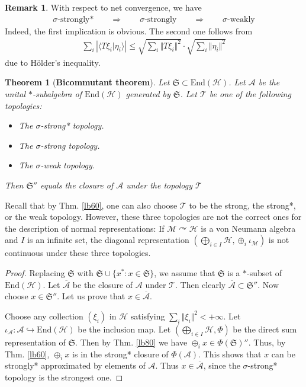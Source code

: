 \documentclass[12pt,b5paper,notitlepage]{article}
\theoremstyle{definition}
\newtheorem{rem}[df]{Remark}
\theoremstyle{plain}
\newtheorem{thm}[df]{Theorem}
\newcommand{\fk}{\mathfrak}
\newcommand{\mc}{\mathcal}
\newcommand{\ovl}{\overline}
\newcommand{\End}{\mathrm{End}} %
\newcommand{\bk}[1]{\langle {#1}\rangle}
\numberwithin{equation}{section}
\begin{document}
\begin{rem}
With respect to net convergence, we have
\begin{align*}
\text{$\sigma$-strongly*}\qquad\Longrightarrow\qquad\text{$\sigma$-strongly}\qquad\Longrightarrow\qquad\text{$\sigma$-weakly}
\end{align*}
Indeed, the first implication is obvious. The second one follows from
\begin{align*}
\sum_i |\bk{T\xi_i|\eta_i}|\leq\sqrt{\sum_i\Vert T\xi_i\Vert^2}\cdot\sqrt{\sum_i\Vert\eta_i\Vert^2}
\end{align*}
due to H\"older's inequality.
\end{rem}



\begin{thm}[\textbf{Bicommutant theorem}]\label{lb86}
Let $\fk S\subset\End(\mc H)$. Let $\mc A$ be the unital $*$-subalgebra of $\End(\mc H)$ generated by $\fk S$. Let $\mc T$ be one of the following topologies:
\begin{itemize}
\item[(a)] The $\sigma$-strong* topology.
\item[(b)] The $\sigma$-strong topology.
\item[(c)] The $\sigma$-weak topology.
\end{itemize}
Then $\fk S''$ equals the closure of $\mc A$ under the topology $\mc T$
\end{thm}

Recall that by Thm. \ref{lb60}, one can also choose $\mc T$ to be the strong, the strong*, or the weak topology. However, these three topologies are not the correct ones for the description of normal representations: If $\mc M\curvearrowright\mc H$ is a von Neumann algebra and $I$ is an infinite set, the diagonal representation $(\bigoplus_{i\in I}\mc H,\oplus_i\iota_{\mc M})$ is not continuous under these three topologies.


\begin{proof}
Replacing $\fk S$ with $\fk S\cup\{x^*:x\in\fk S\}$, we assume that $\fk S$ is a $*$-subset of $\End(\mc H)$. Let $\ovl{\mc A}$ be the closure of $\mc A$ under $\mc T$. Then clearly $\ovl{\mc A}\subset\fk S''$. Now choose $x\in\fk S''$. Let us prove that $x\in\ovl{\mc A}$. 




Choose any collection $(\xi_i)$ in $\mc H$ satisfying $\sum_i\Vert\xi_i\Vert^2<+\infty$. Let $\iota_{\mc A}:\mc A\hookrightarrow\End(\mc H)$ be the inclusion map. Let $(\bigoplus_{i\in I}\mc H,\Phi)$ be the direct sum representation of $\fk S$. Then by Thm. \ref{lb80} we have $\oplus_i x\in\Phi(\fk S)''$. Thus, by Thm. \ref{lb60}, $\oplus_i x$ is in the strong* closure of $\Phi(\mc A)$. This shows that $x$ can be strongly* approximated by elements of $\mc A$. Thus $x\in\ovl{\mc A}$, since the $\sigma$-strong* topology is the strongest one.
\end{proof}
\end{document}
